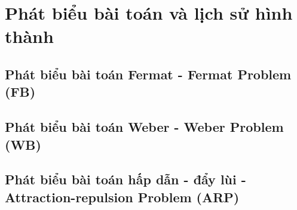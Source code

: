 \chapter{Phát biểu bài toán và lịch sử hình thành}


\section{Phát biểu bài toán Fermat - Fermat Problem (FB)}



\section{Phát biểu bài toán Weber - Weber Problem (WB)}



\section{Phát biểu bài toán hấp dẫn - đẩy lùi - Attraction-repulsion Problem (ARP)}
